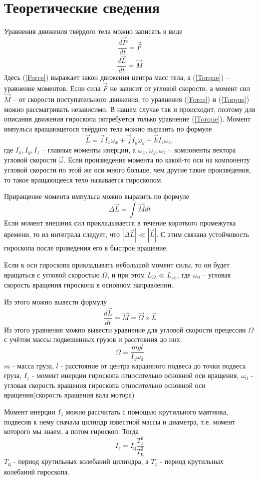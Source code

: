 \documentclass[a4paper, 12pt]{article}
\begin{document}
	\section*{Теоретические сведения}
		Уравнения движения твёрдого тела можно записать в виде
		\begin{equation}
			\label{Force}
			\frac{d \vec{P}}{dt} = \vec{F}
		\end{equation}
		\begin{equation}
			\label{Torque}
			\frac{d \vec{L}}{dt} = \vec{M}
		\end{equation}
		Здесь (\ref{Force}) выражает закон движения центра масс тела, а (\ref{Torque}) -- уравнение моментов. Если сила $\vec{F}$ не зависит от угловой скорости, а момент сил $\vec{M}$ -- от скорости поступательного движения, то уравнения (\ref{Force}) и (\ref{Torque}) можно рассматривать независимо. В нашем случае так и происходит, поэтому для описания движения гироскопа потребуется только уравнение (\ref{Torque}).
		Момент импульса вращающегося твёрдого тела можно выразить по формуле
		$$\vec{L} = \vec{i} I_x \omega_x + \vec{j} I_y \omega_y  + \vec{k} I_z \omega_z,$$
		где $I_x, I_y, I_z$ -- главные моменты инерции, а $\omega_x, \omega_y, \omega_z$ -- компоненты вектора угловой скорости $\vec{\omega}$. Если произведение момента по какой-то оси на компоненту угловой скорости по этой же оси много больше, чем другие такие произведения, то такое вращающееся тело называется гироскопом.
		\par
		Приращение момента импульса можно выразить по формуле
		$$ \Delta \vec{L} = \int \vec{M} dt$$
		Если момент внешних сил прикладывается в течение короткого промежутка времени, то из интеграла следует, что $|\Delta \vec{L}| \ll |\vec{L}|$. С этим связана устойчивость гироскопа после приведения его в быстрое вращение.
		\par
		Если к оси гироскопа прикладывать небольшой момент силы, то он будет вращаться с угловой скоростью $\Omega$, и при этом $L_\Omega \ll L_{\omega_0}$, где $\omega_0$ -- угловая скорость вращения гироскопа в основном направлении.
		\par
		Из этого можно вывести формулу
		$$ \frac{d \vec{L}}{dt} = \vec{M} = \vec{\Omega} \times \vec{L} $$
		Из этого уравнения можно вывести уравнение для угловой скорости прецессии $\Omega$ с учётом массы подвешенных грузов и расстояния до них.
		$$\Omega = \frac{m g l}{I_z \omega_0}$$
		$m$ - масса груза,
		$l$ - расстояние от центра карданного подвеса до точки подвеса груза,
		$I_z$ - момент инерции гироскопа относительно основной оси вращения,
		$\omega_0$ - угловая скорость вращения гироскопа относительно основной оси вращения(скорость вращения вала мотора)
		\par
		Момент инерции $I_z$ можно рассчитать с помощью крутильного маятника, подвесив к нему сначала цилиндр известной массы и диаметра, т.е. момент которого мы знаем, а потом гироскоп. Тогда
		$$ I_z = I_ц \frac{T_z^2}{T_ц^2} $$
		$T_ц$ - период крутильных колебаний цилиндра, а $T_z$ - период крутильных колебаний гироскопа.
\end{document}
